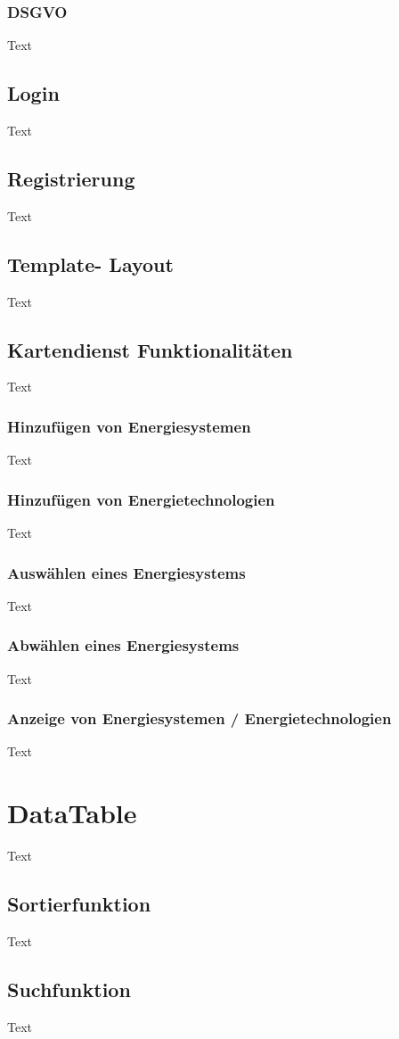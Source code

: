 \subsubsection{DSGVO}
Text

\subsection{Login}
Text
\subsection{Registrierung}
Text
\subsection{Template- Layout}
Text
\subsection{Kartendienst Funktionalitäten}
Text
\subsubsection{Hinzufügen von Energiesystemen}
Text
\subsubsection{Hinzufügen von Energietechnologien}
Text
\subsubsection{Auswählen eines Energiesystems}
Text
\subsubsection{Abwählen eines Energiesystems}
Text
\subsubsection{Anzeige von Energiesystemen / Energietechnologien}
Text


\section{DataTable}
Text
\subsection{Sortierfunktion}
Text
\subsection{Suchfunktion}
Text
